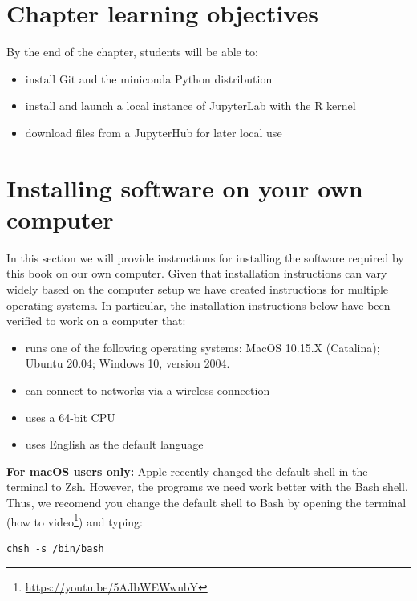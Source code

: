 \documentclass[
]{krantz}
\providecommand{\tightlist}{%
  \setlength{\itemsep}{0pt}\setlength{\parskip}{0pt}}
\renewcommand{\href}[2]{#2\footnote{\url{#1}}}
\begin{document}
\hypertarget{chapter-learning-objectives-11}{%
\section{Chapter learning objectives}\label{chapter-learning-objectives-11}}

By the end of the chapter, students will be able to:

\begin{itemize}
\tightlist
\item
  install Git and the miniconda Python distribution
\item
  install and launch a local instance of JupyterLab with the R kernel
\item
  download files from a JupyterHub for later local use
\end{itemize}

\hypertarget{installing-software-on-your-own-computer}{%
\section{Installing software on your own computer}\label{installing-software-on-your-own-computer}}

In this section we will provide instructions for installing the software
required by this book on our own computer.
Given that installation instructions can vary widely based on the computer setup
we have created instructions for multiple operating systems.
In particular, the installation instructions below have been verified to work
on a computer that:

\begin{itemize}
\tightlist
\item
  runs one of the following operating systems: MacOS 10.15.X (Catalina); Ubuntu 20.04; Windows 10, version 2004.
\item
  can connect to networks via a wireless connection
\item
  uses a 64-bit CPU
\item
  uses English as the default language
\end{itemize}

\textbf{For macOS users only:} Apple recently changed the default shell in the terminal to Zsh.
However, the programs we need work better with the Bash shell. Thus, we recomend you change
the default shell to Bash by opening the terminal
(\href{https://youtu.be/5AJbWEWwnbY}{how to video}) and typing:

\begin{verbatim}
chsh -s /bin/bash
\end{verbatim}
\end{document}
